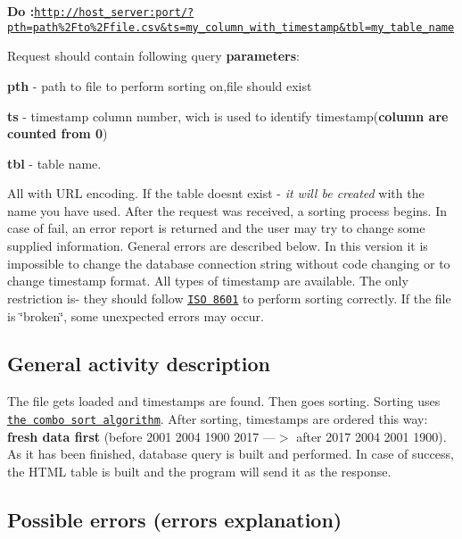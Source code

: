 {\bfseries Do \+:}{\ttfamily \href{http://host_server:port/?pth=path%2Fto%2Ffile.csv&ts=my_column_with_timestamp&tbl=my_table_name}{\tt http\+://host\+\_\+server\+:port/?pth=path\%2\+Fto\%2\+Ffile.\+csv\&ts=my\+\_\+column\+\_\+with\+\_\+timestamp\&tbl=my\+\_\+table\+\_\+name}}

Request should contain following query {\bfseries parameters}\+:
\begin{DoxyItemize}
\item {\bfseries pth} -\/ path to file to perform sorting on,file should exist
\item {\bfseries ts} -\/ timestamp column number, wich is used to identify timestamp({\bfseries column are counted from 0})
\item {\bfseries tbl} -\/ table name.
\end{DoxyItemize}

All with U\+RL encoding. If the table doesn\textquotesingle{}t exist -\/ {\itshape it will be created} with the name you have used. After the request was received, a sorting process begins. In case of fail, an error report is returned and the user may try to change some supplied information. General errors are described below. In this version it is impossible to change the database connection string without code changing or to change timestamp format. All types of timestamp are available. The only restriction is-\/ they should follow \href{https://en.wikipedia.org/wiki/ISO_8601}{\tt I\+SO 8601} to perform sorting correctly. If the file is \char`\"{}broken\char`\"{}, some unexpected errors may occur.

\subsection*{General activity description}

The file gets loaded and timestamps are found. Then goes sorting. Sorting uses \href{https://en.wikipedia.org/wiki/Comb_sort}{\tt the combo sort algorithm}. After sorting, timestamps are ordered this way\+: {\bfseries fresh data first} (before 2001 2004 1900 2017 ---$>$ after 2017 2004 2001 1900). As it has been finished, database query is built and performed. In case of success, the H\+T\+ML table is built and the program will send it as the response.

\subsection*{Possible errors (errors explanation)}

